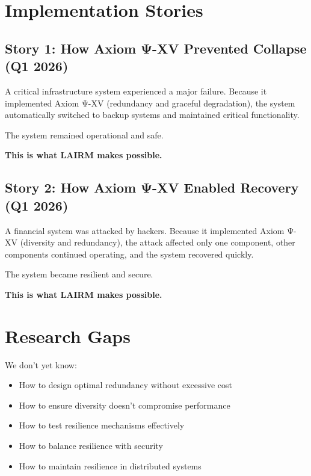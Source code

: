 \vspace{0.5cm}

\section{Implementation Stories}

\subsection{Story 1: How Axiom Ψ-XV Prevented Collapse (Q1 2026)}

A critical infrastructure system experienced a major failure. Because it implemented Axiom Ψ-XV (redundancy and graceful degradation), the system automatically switched to backup systems and maintained critical functionality.

The system remained operational and safe.

\textbf{This is what LAIRM makes possible.}

\subsection{Story 2: How Axiom Ψ-XV Enabled Recovery (Q1 2026)}

A financial system was attacked by hackers. Because it implemented Axiom Ψ-XV (diversity and redundancy), the attack affected only one component, other components continued operating, and the system recovered quickly.

The system became resilient and secure.

\textbf{This is what LAIRM makes possible.}

\vspace{0.5cm}

\section{Research Gaps}

We don't yet know:

\begin{itemize}
    \item How to design optimal redundancy without excessive cost
    
    \item How to ensure diversity doesn't compromise performance
    
    \item How to test resilience mechanisms effectively
    
    \item How to balance resilience with security
    
    \item How to maintain resilience in distributed systems
\end{itemize}

